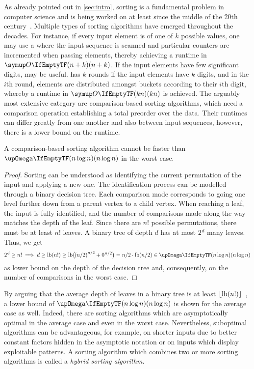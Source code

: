 As already pointed out in \cref{sec:intro}, sorting is a fundamental problem in computer science and is being worked on at least since the middle of the 20th century~\cite{hoare1962quicksort,williams1964heapsort,floyd1964treesort}.
Multiple types of sorting algorithms have emerged throughout the decades.
For instance, if every input element is of one of \(k\) possible values, one may use a \CS{} where the input sequence is scanned and particular counters are incremented when passing elements, thereby achieving a runtime in \(\bigoh{n +  k}\).
If the input elements have few significant digits, \RS{} may be useful.
\RS{} has \(k\) rounds if the input elements have \(k\) digits, and in the \(i\)th round, elements are distributed amongst buckets according to their \(i\)th digit, whereby a runtime in \(\bigoh{kn}\) is achieved.
The arguably most extensive category are comparison-based sorting algorithms, which need a comparison operation establishing a total preorder over the data.
Their runtimes can differ greatly from one another and also between input sequences, however, there is a lower bound on the runtime.
\begin{theorem}
	A comparison-based sorting algorithm cannot be faster than \(\bigomega{n \log n}\) in the worst case.~\cite[91\psq]{maurer1974datenstrukturen}
\end{theorem}
\begin{proof}
	Sorting can be understood as identifying the current permutation of the input and applying a new one.
	The identification process can be modelled through a binary decision tree.
	Each comparison made corresponds to going one level further down from a parent vertex to a child vertex.
	When reaching a leaf, the input is fully identified, and the number of comparisons made along the way matches the depth of the leaf.
	Since there are \(n!\) possible permutations, there must be at least \(n!\) leaves.
	A binary tree of depth \(d\) has at most \(2\mspace{1mu}^d\) many leaves.
	Thus, we get
	\begin{equation*}
		2\mspace{1mu}^d \ge n! \implies d \ge \lb(n!) \ge \lb\paren[\big]{\mspace{-2mu}\paren*{n/2}^{n/2} + 0\mspace{1mu}^{n/2}} = n/2 \cdot \lb\paren{n/2} \in \bigomega{n \log n}
	\end{equation*}
	as lower bound on the depth of the decision tree and, consequently, on the number of comparisons in the worst case.
\end{proof}
By arguing that the average depth of leaves in a binary tree is at least \(\lfloor\operatorname{lb}(n!)\rfloor\)~\cite{blum2011comparison}, a lower bound of \(\bigomega{n \log n}\) is shown for the average case as well.
Indeed, there are sorting algorithms which are asymptotically optimal in the average case and even in the worst case.
Nevertheless, suboptimal algorithms can be advantageous, for example, on shorter inputs due to better constant factors hidden in the asymptotic notation or on inputs which display exploitable patterns.
A sorting algorithm which combines two or more sorting algorithms is called a \emph{hybrid sorting algorithm}.


